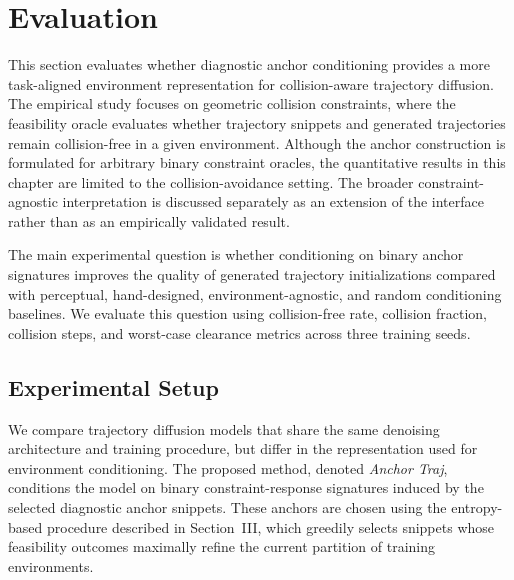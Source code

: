 
\section{Evaluation}\label{sec:evaluation}


This section evaluates whether diagnostic anchor conditioning provides a more task-aligned environment representation for collision-aware trajectory diffusion. The empirical study focuses on geometric collision constraints, where the feasibility oracle evaluates whether trajectory snippets and generated trajectories remain collision-free in a given environment. Although the anchor construction is formulated for arbitrary binary constraint oracles, the quantitative results in this chapter are limited to the collision-avoidance setting. The broader constraint-agnostic interpretation is discussed separately as an extension of the interface rather than as an empirically validated result.

The main experimental question is whether conditioning on binary anchor signatures improves the quality of generated trajectory initializations compared with perceptual, hand-designed, environment-agnostic, and random conditioning baselines. We evaluate this question using collision-free rate, collision fraction, collision steps, and worst-case clearance metrics across three training seeds.

\subsection{Experimental Setup}

We compare trajectory diffusion models that share the same denoising architecture and training procedure, but differ in the representation used for environment conditioning. The proposed method, denoted \textit{Anchor Traj}, conditions the model on binary constraint-response signatures induced by the selected diagnostic anchor snippets. These anchors are chosen using the entropy-based procedure described in Section~III, which greedily selects snippets whose feasibility outcomes maximally refine the current partition of training environments.

